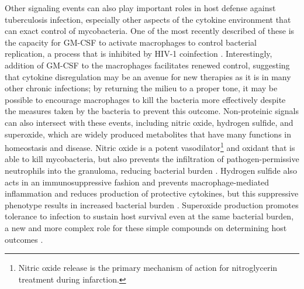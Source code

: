 Other signaling events can also play important roles in host defense against tuberculosis infection, especially other aspects of the cytokine environment that can exact control of mycobacteria. One of the most recently described of these is the capacity for GM\hyp{}CSF to activate macrophages to control bacterial replication, a process that is inhibited by HIV\hyp{}1 coinfection \citep{Bryson2019}. Interestingly, addition of GM\hyp{}CSF to the macrophages facilitates renewed control, suggesting that cytokine disregulation may be an avenue for new therapies as it is in many other chronic infections; by returning the milieu to a proper tone, it may be possible to encourage macrophages to kill the bacteria more effectively despite the measures taken by the bacteria to prevent this outcome. Non\hyp{}proteinic signals can also intersect with these events, including nitric oxide, hydrogen sulfide, and superoxide, which are widely produced metabolites that have many functions in homeostasis and disease. Nitric oxide is a potent vasodilator\footnote{Nitric oxide release is the primary mechanism of action for nitroglycerin treatment during infarction.} and oxidant that is able to kill mycobacteria, but also prevents the infiltration of pathogen\hyp{}permissive neutrophils into the granuloma, reducing bacterial burden \citep{Mishra2017b, MacMicking1995, MacMicking1997a, MacMicking1997b, Szabo2007}. Hydrogen sulfide also acts in an immunosuppressive fashion and prevents macrophage\hyp{}mediated inflammation and reduces production of protective cytokines, but this suppressive phenotype results in increased bacterial burden \citep{Rahman2020}. Superoxide production promotes tolerance to infection to sustain host survival even at the same bacterial burden, a new and more complex role for these simple compounds on determining host outcomes \citep{Olive2018}.

